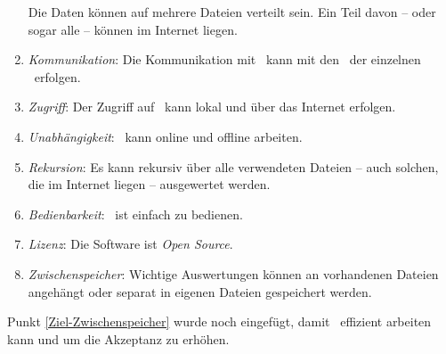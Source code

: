 \begin{enumerate}
	Die Daten können auf mehrere Dateien verteilt sein.
	Ein Teil davon -- oder sogar alle -- können im Internet liegen.
	\item \label{Ziel-Kommunikation} \emph{Kommunikation}:
	Die Kommunikation mit \ASBA\ kann mit den \Fachbegriffen\ der einzelnen \Fachgebiete\ erfolgen.
	\item \label{Ziel-Zugriff} \emph{Zugriff}:
	Der Zugriff auf \ASBA\ kann lokal und über das Internet erfolgen.
	\item \label{Ziel-Unabhaengigkeit} \emph{Unabhängigkeit}:
	\ASBA\ kann online und offline arbeiten.
	\item \label{Ziel-Rekursion} \emph{Rekursion}:
	Es kann rekursiv über alle verwendeten Dateien -- auch solchen, die im Internet liegen -- ausgewertet werden.
	\item \label{Ziel-Bedienbarkeit} \emph{Bedienbarkeit}:
	\ASBA\ ist einfach zu bedienen.
	\item \label{Ziel-Lizenz} \emph{Lizenz}:
	Die Software ist \emph{Open Source}.
	\item \label{Ziel-Zwischenspeicher} \emph{Zwischenspeicher}:
	Wichtige Auswertungen können an vorhandenen Dateien angehängt oder separat in eigenen Dateien gespeichert werden.
\end{enumerate}
%
Punkt \ref{Ziel-Zwischenspeicher} wurde noch eingefügt, damit \ASBA\ effizient arbeiten kann und um die Akzeptanz zu erhöhen.


